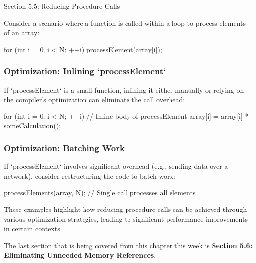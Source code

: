 \begin{notes}{Section 5.5: Reducing Procedure Calls}
    \begin{highlight}
        Consider a scenario where a function is called within a loop to process elements of an array:
    
    \begin{code}[C]
    for (int i = 0; i < N; ++i) {
        processElement(array[i]);
    }
    \end{code}
    
        \subsubsection*{Optimization: Inlining `processElement`}
    
        If `processElement` is a small function, inlining it either manually or relying on the compiler's optimization can eliminate the call overhead:
    
    \begin{code}[C]
    for (int i = 0; i < N; ++i) {
        // Inline body of processElement
        array[i] = array[i] * someCalculation();
    }
    \end{code}
    
        \subsubsection*{Optimization: Batching Work}
    
        If `processElement` involves significant overhead (e.g., sending data over a network), consider restructuring the code to batch work:
    
    \begin{code}[C]
    processElements(array, N); // Single call processes all elements
    \end{code}
    
        These examples highlight how reducing procedure calls can be achieved through various optimization strategies, leading to significant performance improvements in certain contexts.
    \end{highlight}    
\end{notes}

The last section that is being covered from this chapter this week is \textbf{Section 5.6: Eliminating Unneeded Memory References}.

